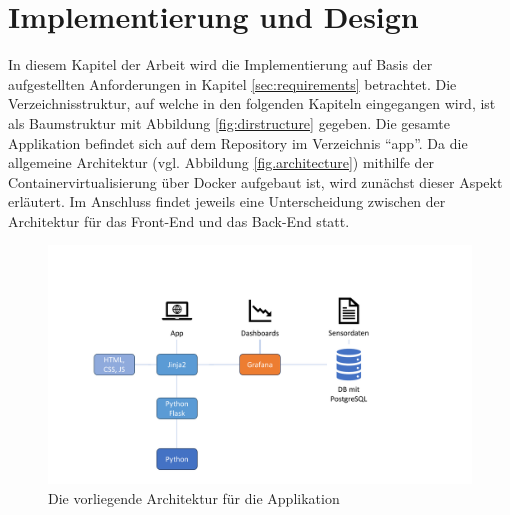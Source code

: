 \chapter{Implementierung und Design}
\label{sec:implementation}
In diesem Kapitel der Arbeit wird die Implementierung auf Basis der aufgestellten Anforderungen in Kapitel \ref{sec:requirements} betrachtet. Die Verzeichnisstruktur, auf welche in den folgenden Kapiteln eingegangen wird, ist als Baumstruktur mit Abbildung \ref{fig:dirstructure} gegeben. Die gesamte Applikation befindet sich auf dem Repository im Verzeichnis \enquote{app}. Da die allgemeine Architektur (vgl. Abbildung \ref{fig.architecture}) mithilfe der Containervirtualisierung über Docker aufgebaut ist, wird zunächst dieser Aspekt erläutert. Im Anschluss findet jeweils eine Unterscheidung zwischen der Architektur für das Front-End und das Back-End statt.

\begin{figure}[t]
    \centering
    \includegraphics[width=\widefigurewidth]{appendices/Architektur.pdf}
    \caption[Architektur]{Die vorliegende Architektur für die Applikation}
    \label{fig:architecture}
\end{figure}

